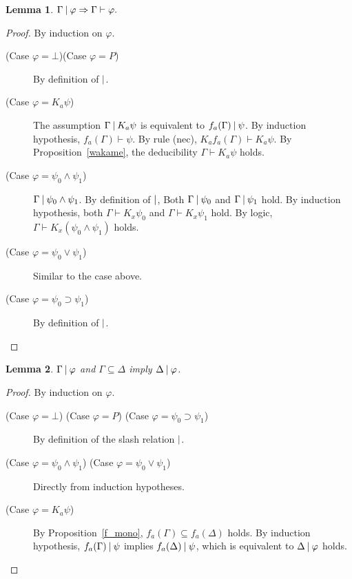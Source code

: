 \documentclass[doctor]{iscs-thesis}
\newtheorem{lemma}{Lemma}
\begin{document}
\begin{lemma}
\label{ssound}
 $\Gamma\mathbin{\mid}\varphi\Rightarrow \Gamma\vdash\varphi.$
\end{lemma}
\begin{proof}
 By induction on $\varphi$.
 \begin{description}
  \item[ (Case $\varphi = \bot$)(Case $\varphi = P$)]
	     By definition of $\mathbin{\mid}$.
  \item[ (Case $\varphi = K_a\psi$)]
	     The assumption $\Gamma\mathbin{\mid} K_a\psi$ is equivalent to 
	     $f_a(\Gamma)\mathbin{\mid} \psi$.
	     By induction hypothesis,
	     $f_a(\Gamma)\vdash \psi$.
	     By rule (nec), 
	     $K_af_a(\Gamma)\vdash  K_a\psi$.
	     By Proposition~\ref{wakame},
	     the deducibility $\Gamma\vdash K_a\psi$ holds.
  \item[ (Case $\varphi = \psi_0 \wedge \psi_1$)]
	     $\Gamma\mathbin{\mid}\psi_0\wedge \psi_1$.
	     By definition of $\mathbin{\mid}$,
	     Both $\Gamma\mathbin{\mid}\psi_0$ and $\Gamma\mathbin{\mid}\psi_1$ hold.
	     By induction hypothesis,
	     both $\Gamma\vdash K_x\psi_0$ and
	     $\Gamma\vdash K_x\psi_1$ hold.
	     By logic, $\Gamma\vdash K_x(\psi_0\wedge\psi_1)$ holds.
  \item[ (Case $\varphi = \psi_0\vee\psi_1$)]
	     Similar to the case above.
  \item[ (Case $\varphi = \psi_0\supset \psi_1$)]
	     By definition of $\mathbin{\mid}$.
 \end{description}
\end{proof}

\begin{lemma}
 \label{aslash-mono}
$\Gamma\mathbin{\mid}\varphi$ and $\Gamma\subseteq \Delta$ imply $\Delta\mathbin{\mid}\varphi$.
\end{lemma}
\begin{proof}
 By induction on $\varphi$.
 \begin{description}
  \item[ (Case $\varphi=\bot$) (Case $\varphi =P$) (Case $\varphi =\psi_0\supset \psi_1$)]
	     By definition of the slash relation $\mathbin{\mid}$.
  \item[ (Case $\varphi =\psi_0\wedge\psi_1$) (Case $\varphi =\psi_0\vee\psi_1$)]
	     Directly from induction hypotheses.
  \item[ (Case $\varphi = K_a\psi$)]
	     By Proposition~\ref{f_mono},
	     $f_a(\Gamma)\subseteq f_a(\Delta)$ holds.
	     By induction hypothesis, $f_a(\Gamma)\mathbin{\mid} \psi$ implies
	     $f_a(\Delta)\mathbin{\mid}\psi$, which is equivalent to $\Delta\mathbin{\mid}\varphi$ holds.
 \end{description}
\end{proof}
\end{document}
